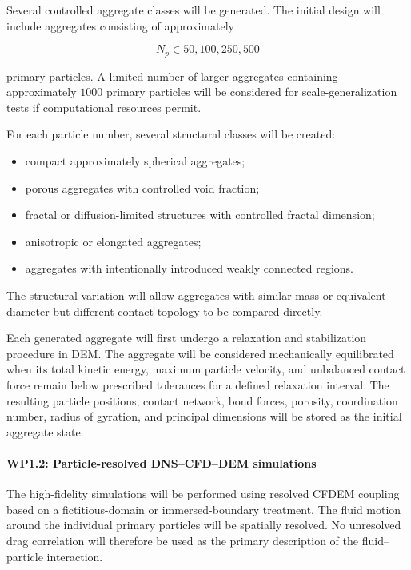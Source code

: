 \documentclass[11pt,a4paper,twoside]{scrartcl}
\begin{document}
Several controlled aggregate classes will be generated. The initial design will include aggregates consisting of approximately

\begin{equation}
	N_p \in {50,100,250,500}
\end{equation}

primary particles. A limited number of larger aggregates containing approximately $1000$ primary particles will be considered for scale-generalization tests if computational resources permit.

For each particle number, several structural classes will be created:

\begin{itemize}
	\item compact approximately spherical aggregates;
	
	\item porous aggregates with controlled void fraction;
	
	\item fractal or diffusion-limited structures with controlled fractal dimension;
	
	\item anisotropic or elongated aggregates;
	
	\item aggregates with intentionally introduced weakly connected regions.
\end{itemize}

The structural variation will allow aggregates with similar mass or equivalent diameter but different contact topology to be compared directly.

Each generated aggregate will first undergo a relaxation and stabilization procedure in DEM. The aggregate will be considered mechanically equilibrated when its total kinetic energy, maximum particle velocity, and unbalanced contact force remain below prescribed tolerances for a defined relaxation interval. The resulting particle positions, contact network, bond forces, porosity, coordination number, radius of gyration, and principal dimensions will be stored as the initial aggregate state.

\paragraph{WP1.2: Particle-resolved DNS--CFD--DEM simulations}

The high-fidelity simulations will be performed using resolved CFDEM coupling based on a fictitious-domain or immersed-boundary treatment. The fluid motion around the individual primary particles will be spatially resolved. No unresolved drag correlation will therefore be used as the primary description of the fluid--particle interaction.
\end{document}
